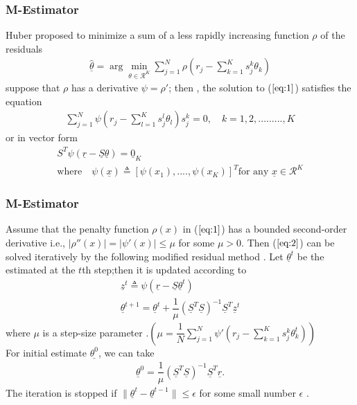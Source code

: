 \documentclass{beamer}
\newcommand{\argminD}{\arg\!\min}
\begin{document}

\begin{frame}
\frametitle{M-Estimator}
Huber proposed to minimize a sum of a less rapidly increasing function  $\rho$ of the residuals
\begin{align}
\label{eq:1}
    \underline{\hat{\theta}}=\argminD_{\theta \in \mathcal{R}^{K}} \sum^{N}_{j=1} \rho \left( r_{j} - \sum^{K} _{k=1} s^{k}_{j} \theta_{k} \right)
\end{align}
suppose that $\rho$ has a derivative $\psi=\rho'$; then , the solution to ($\ref{eq:1}$) satisfies the equation
 \begin{align}
 \label{eq:2}
\sum_{j=1}^{N}\psi \left( r_{j} - \sum _{l=1} ^{K} s^{l}_{j} \theta_{l}  \right) s^{k}_{j} =0, \quad k=1,2,.........,K
\end{align}
or in vector form
\begin{align}
    S^{T}\psi\left(\underline{r}-\underline{S}\underline{\theta}\right)= \underline{0}_{K}\\
\text{where} \quad      \psi(\underline{x}) \triangleq \left[ \psi(x_{1}) ,....,\psi(x_{K}) \right]^{T} \text{for any } \underline{x} \in \mathcal{R}^{K}
\end{align}
\end{frame}


\begin{frame}
\frametitle{M-Estimator}
Assume that the penalty function $\rho(x)$ in ($\ref{eq:1}$) has a bounded second-order derivative i.e., $|\rho''(x)|=|\psi ' (x)| \leq \mu$ for some $\mu > 0$.
Then ($\ref{eq:2}$) can be solved iteratively by the following modified residual method . Let $\underline{\theta}^{t}$ be the estimated at the $t$th step;then it is updated according to 
\begin{align}
    \underline{z}^{t} \triangleq \psi \left(\underline{r}-\underline{S} \underline{\theta}^{t} \right)\\
    \underline{\theta}^{t+1} = \underline{\theta}^{t} + \dfrac{1}{\mu} \left(\underline{S}^{T} \underline{S}\right)^{-1} \underline{S}^{T} \underline{z}^{t}
\end{align}
where $\mu$ is a step-size parameter .$\left( \mu = \dfrac{1}{N} \sum_{j=1}^{N} \psi ' \left( r_{j} - \sum^{K} _{k=1} s^{k}_{j} \theta_{k} ^{t} \right) \right)$\\
For initial estimate $\underline{\theta^{0}}$, we can take 
\begin{align}
    \underline{\theta}^{0} = \dfrac{1}{\mu} \left( \underline{S}^{T} \underline {S} \right)^{-1} \underline{S}^{T} \underline{r}.
\end{align}
The iteration is stopped if $\lVert  \underline{\theta}^{t} - \underline{\theta}^{t-1} \rVert \leq \epsilon $   for some small number $\epsilon$ .
\end{frame}
\end{document}
